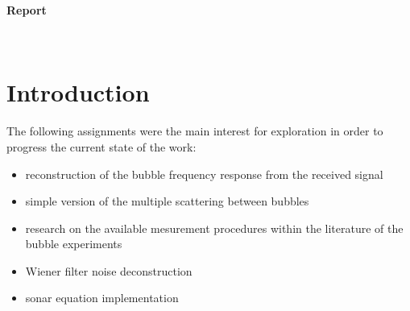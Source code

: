 \documentclass[11pt]{article}
\begin{document}
%  

\thispagestyle{empty}

\begin{center}
{\large{}}   


\vspace*{4cm}
{\Large\textbf{Report \\ }}   


\vspace*{7cm}
 {\Large{}} \\\vspace*{0.1cm}

\vspace*{2.3cm}
\vspace*{0.2cm}
{\large{}}   
\end{center}

\newpage

\tableofcontents

\section{Introduction}

The following assignments were the main interest for exploration in order to progress the current state of the work:

\begin{itemize}
    \item reconstruction of the bubble frequency response from the received signal
    \item simple version of the multiple scattering between bubbles
    \item research on the available mesurement procedures within the literature of the bubble experiments
    \item Wiener filter noise deconstruction
    \item sonar equation implementation
\end{itemize}
\end{document}

